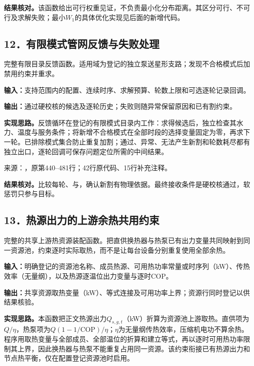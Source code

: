 \noindent\textbf{结果核对。}该函数给出可行权重见证，不负责最小化分布距离。其区分可行、不可行及求解失败；最小$W_1$的具体优化实现见后面的新增代码。

\subsection*{12．有限模式管网反馈与失败处理}
完整有限目录反馈函数。适用域为登记的独立泵送星形支路；发现不合格模式后加禁用约束并重求。

\noindent\textbf{输入：}支持范围内的配置、连续时序、求解预算、轮数上限和可选逐轮记录回调。\par
\noindent\textbf{输出：}通过硬校核的候选及逐轮历史；失败则随异常保留原因和已有割约束。\par

\noindent\textbf{实现思路。}反馈循环在登记的有限模式目录内工作：求得候选后，独立检查其水力、温度与服务条件；将新增不合格模式在全部时段的选择变量固定为零，再求下一轮。已排除模式集合防止重复加割；通过、异常、无法产生新割和轮数耗尽都有独立出口，逐轮回调可保存问题定位所需的中间结果。

{\small 来源：，原第440--481行；42行原代码、15行补充注释。}\par

\begingroup
{}

\endgroup

\noindent\textbf{结果核对。}比较每轮、与，确认新割有物理依据。最终接收条件是硬校核通过，软惩罚只参与目标。

\subsection*{13．热源出力的上游余热共用约束}
完整的共享上游热资源装配函数。把直供换热器与热泵已有出力变量共同映射到同一资源池，约束逐时实际取热，而不是让每台设备分别重复使用全部余热。

\noindent\textbf{输入：}明确登记的资源池名称、成员热源、可用热功率常量或时序列（kW）、传热效率（无量纲），以及热源逐温位出力变量与逐时COP。\par
\noindent\textbf{输出：}共享资源取热变量（kW）、等式连接及可用功率上界；资源行同时登记以供结果核验。\par

\noindent\textbf{实现思路。}本函数把正文热源出力$Q_{s,g,t}$（kW）折算为资源池上游取热。直供项为$Q/\eta$，热泵项为$Q(1-1/\mathrm{COP})/\eta$；$\eta$为无量纲传热效率，压缩机电功不算余热。程序用取热变量与全部成员、全部温位的折算和建立等式，再以逐时可用热功率限制其上界，因此换热器与热泵不能重复占用同一资源。该约束衔接已有热源出力和节点热平衡，仅在配置登记资源池时启用。

